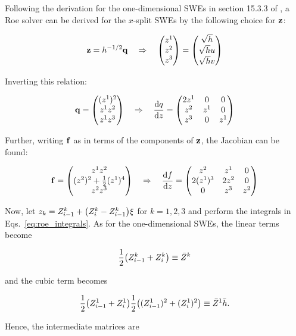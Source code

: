 Following the derivation for the one-dimensional SWEs in section 15.3.3 of \citet{leveque2002finite}, a Roe solver can be derived for the $x$-split SWEs by the following choice for $\vb z$:

\begin{align}
  \vb z = h^{-1/2}\vb q \quad \Rightarrow \quad \mqty(z^1 \\ z^2 \\ z^3) = \mqty(\sqrt{h} \\ \sqrt{h}u \\ \sqrt{h}v)
\end{align}

Inverting this relation:

\begin{align}
  \vb q = \mqty((z^1)^2 \\ z^1z^2 \\ z^1z^3) \quad \Rightarrow \quad \dv{q}{z} = \mqty(
    2z^1 & 0 & 0 \\
    z^2 & z^1 & 0 \\
    z^3 & 0 & z^1
  )
\end{align}

Further, writing $\vb f$ as in terms of the components of $\vb z$, the Jacobian can be found:

\begin{align}
  \vb f = \mqty(z^1z^2 \\ (z^2)^2 + \frac{1}{2}(z^1)^4 \\ z^2z^3) \quad \Rightarrow \quad \dv{f}{z} = \mqty(
    z^2 & z^1 & 0 \\
    2 (z^1)^3 & 2 z^2 & 0 \\
    0 & z^3 & z^2
  )
\end{align}

Now, let $z_k = Z^k_{i-1} + \qty(Z^k_i - Z^k_{i-1})\xi$ for $k = 1, 2, 3$ and perform the integrals in Eqs.~\ref{eq:roe_integrals}. As for the one-dimensional SWEs, the linear terms become

\begin{align}
  \frac{1}{2}\qty(Z^k_{i-1} + Z^k_i) \equiv \bar Z^k
\end{align}

and the cubic term becomes

\begin{align}
  \frac{1}{2}\qty(Z^1_{i-1} + Z^1_i) \frac{1}{2} \qty((Z^1_{i-1})^2 + (Z^1_i)^2) \equiv \bar Z^1 \bar h.
\end{align}

Hence, the intermediate matrices are

